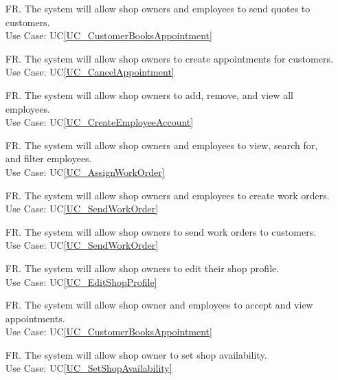 \documentclass[12pt]{article}
\newcounter{reqnum} %
\begin{document}
\begin{itemize}
\item[FR\refstepcounter{reqnum}\thereqnum \label{R_SendQuote}.] The system will allow shop owners and employees to send quotes to customers.\\
Use Case: UC\ref{UC_CustomerBooksAppointment}

\item[FR\refstepcounter{reqnum}\thereqnum \label{R_OwnerAppointment}.] The system will allow shop owners to create appointments for customers.\\
Use Case: UC\ref{UC_CancelAppointment}

\item[FR\refstepcounter{reqnum}\thereqnum \label{R_EditEmployee}.] The system will allow shop owners to add, remove, and view all employees.\\
Use Case: UC\ref{UC_CreateEmployeeAccount}

\item[FR\refstepcounter{reqnum}\thereqnum \label{R_ViewEmployee}.] The system will allow shop owners and employees to view, search for, and filter employees.\\
Use Case: UC\ref{UC_AssignWorkOrder}

\item[FR\refstepcounter{reqnum}\thereqnum \label{R_CreateWorkOrder}.] The system will allow shop owners and employees to create work orders.\\
Use Case: UC\ref{UC_SendWorkOrder}

\item[FR\refstepcounter{reqnum}\thereqnum \label{R_SendWorkOrder}.] The system will allow shop owners to send work orders to customers.\\
Use Case: UC\ref{UC_SendWorkOrder}

\item[FR\refstepcounter{reqnum}\thereqnum \label{R_EditShopProfile}.] The system will allow shop owners to edit their shop profile.\\
Use Case: UC\ref{UC_EditShopProfile}

\item[FR\refstepcounter{reqnum}\thereqnum \label{R_EmployeeAppointment}.] The system will allow shop owner and employees to accept and view appointments.\\
Use Case: UC\ref{UC_CustomerBooksAppointment}

\item[FR\refstepcounter{reqnum}\thereqnum \label{R_SetShopAvailability}.] The system will allow shop owner to set shop availability.\\
Use Case: UC\ref{UC_SetShopAvailability}


\end{itemize}
\end{document}
